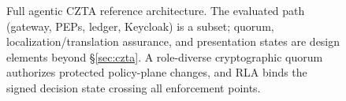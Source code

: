 \documentclass[conference]{IEEEtran}
\begin{document}
\begin{figure}[t]
{}
\caption{Full agentic CZTA reference architecture. The evaluated
path (gateway, PEPs, ledger, Keycloak) is a subset; quorum,
localization/translation assurance, and presentation states are
design elements beyond \S\ref{sec:czta}. A role-diverse
cryptographic quorum authorizes protected policy-plane changes,
and RLA binds the signed decision state crossing all enforcement
points.}
\label{fig:czta}
\end{figure}
\end{document}
